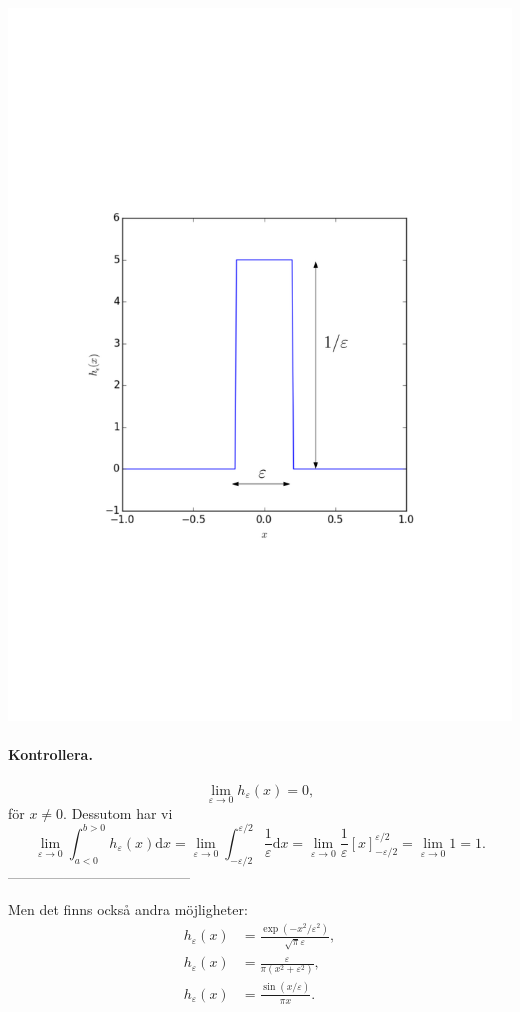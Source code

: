 \documentclass[%
oneside,                 %
final,                   %
10pt]{article}
\begin{document}
\centerline{\includegraphics[width=0.7\linewidth]{fig/delta_step.pdf}}

\vspace{6mm}



\paragraph{Kontrollera.}
$$
\lim_{\varepsilon \to 0} h_\varepsilon(x) = 0,
$$
för $x \neq 0$. Dessutom har vi
$$
\lim_{\varepsilon \to 0} \int_{a<0}^{b>0} h_\varepsilon(x) \mbox{d}x 
= \lim_{\varepsilon \to 0} \int_{-\varepsilon/2}^{\varepsilon/2} \frac{1}{\varepsilon} \mbox{d}x = \lim_{\varepsilon \to 0} \frac{1}{\varepsilon} \left[ x \right]_{-\varepsilon/2}^{\varepsilon/2}
= \lim_{\varepsilon \to 0} 1 = 1.
$$
---------------------------------------

Men det finns också andra möjligheter:
\begin{align}
h_\varepsilon(x) &= \frac{\exp(-x^2 / \varepsilon^2)}{\sqrt{\pi} \varepsilon}, \\ 
h_\varepsilon(x) &= \frac{\varepsilon}{\pi (x^2 + \varepsilon^2)}, \\ 
h_\varepsilon(x) &= \frac{\sin(x/\varepsilon)}{\pi x} \label{eq:sinxdelta}.
\end{align}
\end{document}
